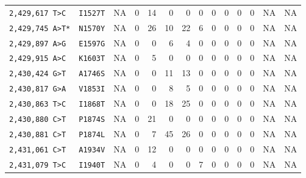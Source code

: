 \begin{tabular}{lllrrrrrrrrrrr}
\texttt{2,429,617 T>C} & \texttt{I1527T} & NA & 0 & 14 & 0 & 0 & 0 & 0 & 0 & 0 & 0 & NA & NA \\

\texttt{2,429,745 A>T*} & \texttt{N1570Y} & NA & 0 & 26 & 10 & 22 & 6 & 0 & 0 & 0 & 0 & NA & NA \\

\texttt{2,429,897 A>G} & \texttt{E1597G} & NA & 0 & 0 & 6 & 4 & 0 & 0 & 0 & 0 & 0 & NA & NA \\

\texttt{2,429,915 A>C} & \texttt{K1603T} & NA & 0 & 5 & 0 & 0 & 0 & 0 & 0 & 0 & 0 & NA & NA \\

\texttt{2,430,424 G>T} & \texttt{A1746S} & NA & 0 & 0 & 11 & 13 & 0 & 0 & 0 & 0 & 0 & NA & NA \\

\texttt{2,430,817 G>A} & \texttt{V1853I} & NA & 0 & 0 & 8 & 5 & 0 & 0 & 0 & 0 & 0 & NA & NA \\

\texttt{2,430,863 T>C} & \texttt{I1868T} & NA & 0 & 0 & 18 & 25 & 0 & 0 & 0 & 0 & 0 & NA & NA \\

\texttt{2,430,880 C>T} & \texttt{P1874S} & NA & 0 & 21 & 0 & 0 & 0 & 0 & 0 & 0 & 0 & NA & NA \\

\texttt{2,430,881 C>T} & \texttt{P1874L} & NA & 0 & 7 & 45 & 26 & 0 & 0 & 0 & 0 & 0 & NA & NA \\

\texttt{2,431,061 C>T} & \texttt{A1934V} & NA & 0 & 12 & 0 & 0 & 0 & 0 & 0 & 0 & 0 & NA & NA \\

\texttt{2,431,079 T>C} & \texttt{I1940T} & NA & 0 & 4 & 0 & 0 & 7 & 0 & 0 & 0 & 0 & NA & NA \\

\bottomrule
\end{tabular}
